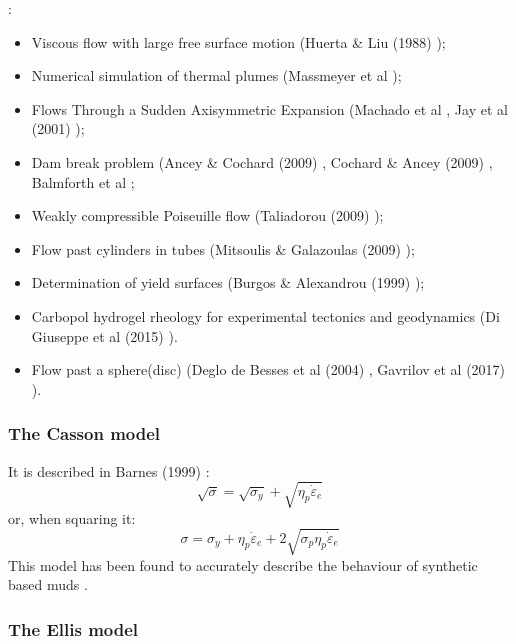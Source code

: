 \noindent\Literature: 
\begin{itemize}
\item Viscous flow with large free surface motion (Huerta \& Liu (1988) \cite{huli88});
\item Numerical simulation of thermal plumes (Massmeyer et al \cite{madd13}); 
\item Flows Through a Sudden Axisymmetric Expansion (Machado et al \cite{mazf}, 
      Jay et al (2001) \cite{jamp01}); 
\item Dam break problem (Ancey \& Cochard (2009) \cite{anco09}, 
      Cochard \& Ancey (2009) \cite{coan09}, Balmforth et al \cite{bafp09};
\item Weakly compressible Poiseuille flow (Taliadorou (2009) \cite{tagm09});
\item Flow past cylinders in tubes (Mitsoulis \& Galazoulas (2009) \cite{miga09});
\item Determination of yield surfaces (Burgos \& Alexandrou (1999) \cite{buae99});
\item Carbopol hydrogel rheology for experimental
      tectonics and geodynamics (Di Giuseppe et al (2015) \cite{dicf15}).
\item Flow past a sphere(disc) (Deglo de Besses et al (2004) \cite{demj04}, 
      Gavrilov et al (2017) \cite{gafp17}). \mscthesis{} 
\end{itemize}


\subsubsection{The Casson model}

It is described in Barnes (1999) \cite{barn99}:
\begin{equation}
\sqrt{\sigma} = \sqrt{\sigma_y} + \sqrt{\eta_p \dot{\varepsilon}_e} 
\end{equation}
or, when squaring it:
\begin{equation}
\sigma = \sigma_y + \eta_p \dot{\varepsilon}_e + 2\sqrt{\sigma_p \eta_p \dot{\varepsilon}_e} 
\end{equation}
This model has been found to accurately describe the behaviour of synthetic based muds \cite{adlo17}. 

\subsubsection{The Ellis model\label{ss:ellis}}

